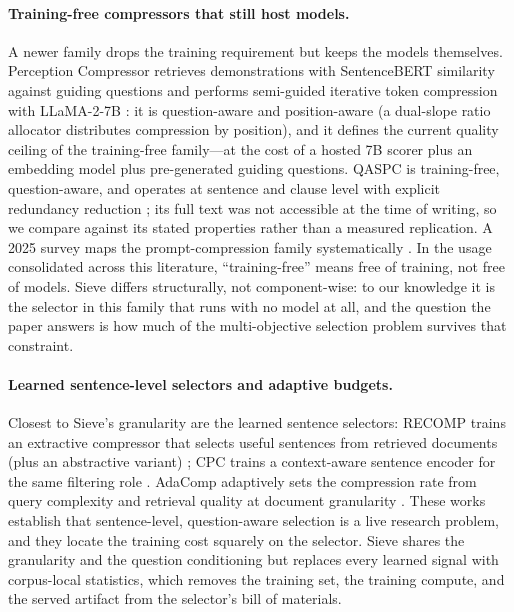 \documentclass[preprint,12pt]{elsarticle}
\theoremstyle{remark}
\newcommand{\method}{Sieve}
\begin{document}
\paragraph{Training-free compressors that still host models.}
A newer family drops the training requirement but keeps the models
themselves.
Perception Compressor retrieves demonstrations with SentenceBERT
similarity against guiding questions and performs semi-guided iterative
token compression with LLaMA-2-7B \citep{tang2025perception}: it is
question-aware and position-aware (a dual-slope ratio allocator
distributes compression by position), and it defines the current
quality ceiling of the training-free family---at the cost of a hosted
7B scorer plus an embedding model plus pre-generated guiding questions.
QASPC is training-free, question-aware, and operates at sentence and
clause level with explicit redundancy reduction
\citep{chen2025qaspc}; its full text was not accessible at the time of
writing, so we compare against its stated properties rather than a
measured replication. A 2025 survey maps the prompt-compression family
systematically \citep{li2025survey}. In the usage consolidated across
this literature, ``training-free'' means free of training, not free of
models. \method{} differs structurally, not component-wise: to our
knowledge it is the selector in this family that runs with no model at
all, and the question the paper answers is how much of the multi-objective selection
problem survives that constraint.

\paragraph{Learned sentence-level selectors and adaptive budgets.}
Closest to \method{}'s granularity are the learned sentence selectors:
RECOMP trains an extractive compressor that selects useful sentences
from retrieved documents (plus an abstractive variant)
\citep{xu2024recomp}; CPC trains a context-aware sentence encoder for
the same filtering role \citep{liskavets2025cpc}. AdaComp adaptively
sets the compression rate from query complexity and retrieval quality
at document granularity \citep{zhang2024adacomp}. These works establish
that sentence-level, question-aware selection is a live research
problem, and they locate the training cost squarely on the selector.
\method{} shares the granularity and the question conditioning but
replaces every learned signal with corpus-local statistics, which
removes the training set, the training compute, and the served
artifact from the selector's bill of materials.
\end{document}
